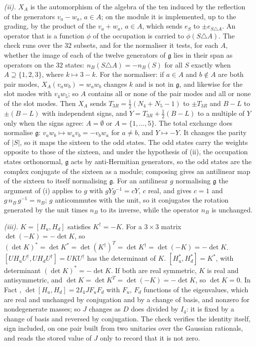 \emph{(ii).} $X_{A}$ is the automorphism of the algebra of the ten induced by the reflection of the generators $v_{a} - w_{a}$, $a \in A$; on the module it is implemented, up to the grading, by the product of the $v_{a} + w_{a}$, $a \in A$, which sends $e_{S}$ to $\pm e_{S \triangle A}$. An operator that is a function $\phi$ of the occupation is carried to $\phi(S \triangle A)$. The check runs over the $32$ subsets, and for the normaliser it tests, for each $A$, whether the image of each of the twelve generators of $\mathfrak{g}$ lies in their span as operators on the $32$ states: $n_{B}(S \triangle A) = -n_{B}(S)$ for all $S$ exactly when $A \supseteq \{1, 2, 3\}$, where $k \mapsto 3 - k$. For the normaliser: if $a \in A$ and $b \notin A$ are both pair modes, $X_{A}(v_{a}w_{b}) = w_{a}w_{b}$ changes $k$ and is not in $\mathfrak{g}$, and likewise for the slot modes with $v_{4}w_{5}$; so $A$ contains all or none of the pair modes and all or none of the slot modes. Then $X_{A}$ sends $T_{3R} = \tfrac12(N_{4} + N_{5} - 1)$ to $\pm T_{3R}$ and $B - L$ to $\pm(B - L)$ with independent signs, and $Y = T_{3R} + \tfrac12(B - L)$ to a multiple of $Y$ only when the signs agree: $A = \emptyset$ or $A = \{1, \dots, 5\}$. The total exchange does normalise $\mathfrak{g}$: $v_{a}w_{b} \mapsto w_{a}v_{b} = -v_{b}w_{a}$ for $a \neq b$, and $Y \mapsto -Y$. It changes the parity of $|S|$, so it maps the sixteen to the odd states. The odd states carry the weights opposite to those of the sixteen, and under the hypothesis of (ii), the occupation states orthonormal, $\mathfrak{g}$ acts by anti-Hermitian generators, so the odd states are the complex conjugate of the sixteen as a module; composing gives an antilinear map of the sixteen to itself normalising $\mathfrak{g}$. For an antilinear $g$ normalising $\mathfrak{g}$ the argument of (i) applies to $g$ with $gYg^{-1} = cY$, $c$ real, and gives $c = 1$ and $g\,n_{B}\,g^{-1} = n_{B}$; $g$ anticommutes with the unit, so it conjugates the rotation generated by the unit times $n_{B}$ to its inverse, while the operator $n_{B}$ is unchanged.

\emph{(iii).} $K = [H_{u}, H_{d}]$ satisfies $K^{\dagger} = -K$. For a $3 \times 3$ matrix $\det(-K) = -\det K$, so $(\det K)^{*} = \det K^{*} = \det (K^{\dagger})^{T} = \det K^{\dagger} = \det(-K) = -\det K$. $[UH_{u}U^{\dagger}, UH_{d}U^{\dagger}] = UKU^{\dagger}$ has the determinant of $K$. $[H_{u}^{*}, H_{d}^{*}] = K^{*}$, with determinant $(\det K)^{*} = -\det K$. If both are real symmetric, $K$ is real and antisymmetric, and $\det K = \det K^{T} = \det(-K) = -\det K$, so $\det K = 0$. In Fact , $\det[H_{u}, H_{d}] = 2I_{4}J F_{u}F_{d}$ with $F_{u}$, $F_{d}$ functions of the eigenvalues, which are real and unchanged by conjugation and by a change of basis, and nonzero for nondegenerate masses; so $J$ changes as $D$ does divided by $I_{4}$: it is fixed by a change of basis and reversed by conjugation. The check verifies the identity itself, sign included, on one pair built from two unitaries over the Gaussian rationals, and reads the stored value of $J$ only to record that it is not zero.


